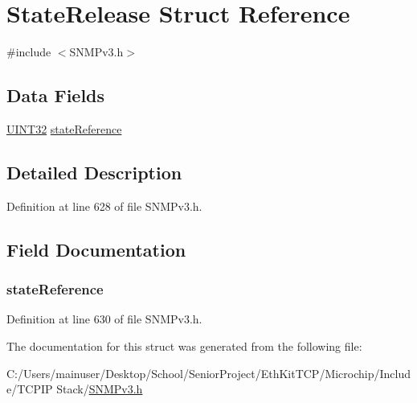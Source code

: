 \hypertarget{struct_state_release}{}\section{State\+Release Struct Reference}
\label{struct_state_release}


{\ttfamily \#include $<$S\+N\+M\+Pv3.\+h$>$}

\subsection*{Data Fields}
\begin{DoxyCompactItemize}
\item 
\hyperlink{_generic_type_defs_8h_a1720f33f59b583f0c2ed071815623a86}{U\+I\+N\+T32} \hyperlink{struct_state_release_a62eef1407cf307242b77d068071cafeb}{state\+Reference}
\end{DoxyCompactItemize}


\subsection{Detailed Description}


Definition at line 628 of file S\+N\+M\+Pv3.\+h.



\subsection{Field Documentation}
\hypertarget{struct_state_release_a62eef1407cf307242b77d068071cafeb}{}
\subsubsection[{state\+Reference}]{ state\+Reference}\label{struct_state_release_a62eef1407cf307242b77d068071cafeb}


Definition at line 630 of file S\+N\+M\+Pv3.\+h.



The documentation for this struct was generated from the following file\+:\begin{DoxyCompactItemize}
\item 
C\+:/\+Users/mainuser/\+Desktop/\+School/\+Senior\+Project/\+Eth\+Kit\+T\+C\+P/\+Microchip/\+Include/\+T\+C\+P\+I\+P Stack/\hyperlink{_s_n_m_pv3_8h}{S\+N\+M\+Pv3.\+h}\end{DoxyCompactItemize}
